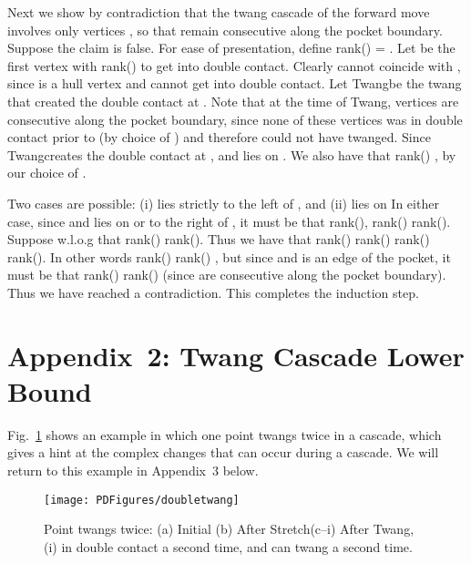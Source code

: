 \pdfoutput=1  \documentclass{article}
\def\st{{\sc Stretch}}
\def\tw{{\sc Twang}}
\newcommand{\figlab}[1]{\label{fig:#1}}
\newcommand{\figref}[1]{\ref{fig:#1}}
\newcommand{\ABox}{
\raisebox{3pt}{\framebox[6pt]{\rule{6pt}{0pt}}}
}
\newenvironment{pf}{{\bf Proof:}}{\hfill\ABox}
\begin{document}
\begin{pf}
Next we show by contradiction that the twang cascade of the forward
move involves only vertices , so that
 remain consecutive along the pocket boundary.
Suppose the claim is false. For ease of presentation, define
rank() = . Let  be the first vertex with rank()  to get into double contact. Clearly  cannot coincide with ,
since  is a hull vertex and cannot get into double contact. Let
\tw be the twang that created the double contact at . Note
that at the time of \tw, vertices  are
consecutive along the pocket boundary, since none of these vertices
was in double contact prior to  (by choice of ) and therefore
could not have twanged. Since \tw creates the double contact
at ,  and lies on . We also have
that rank() , by our choice of .



Two cases are possible: (i)  lies strictly to the left of
, and (ii)  lies on  In either case, since
 and  lies on or to the right of , it
must be that rank(), rank() rank(). Suppose
w.l.o.g that rank()  rank(). Thus we have that rank()
 rank()  rank()  rank(). In other words
rank()  rank() , but since  and  is an edge of the pocket, it must be that
rank()  rank()  (since  are
consecutive along the pocket boundary). Thus we have reached a
contradiction. This completes the induction step.
\end{pf}

\section*{Appendix~2: Twang Cascade Lower Bound}
Fig.~\figref{double.twang} shows an example in which one point 
twangs twice in a cascade,
which gives a hint at the complex changes that can occur during
a cascade.
We will return to this example in Appendix~3 below.

\begin{figure}[htbp]
\centering
\texttt{[image: PDFigures/doubletwang]}
\vspace{-1.7em}\caption{Point  twangs twice: (a) Initial  (b)
After  \st (c--i) After \tw, 
(i)  in double contact a second time, and can
twang a second time. } \figlab{double.twang}
\end{figure}
\end{document}
